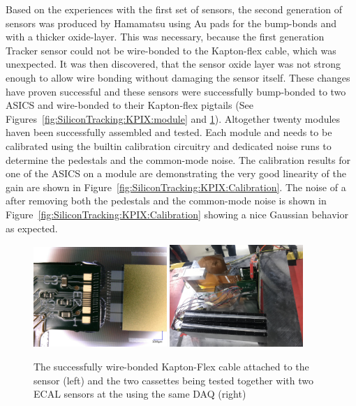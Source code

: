 Based on the experiences with the first set of sensors, the second generation of sensors was produced by Hamamatsu 
using Au pads for the \KPIX bump-bonds and with a thicker oxide-layer. This was necessary, because the first generation Tracker sensor could not be 
wire-bonded to the Kapton-flex cable, which was unexpected. It was then discovered, that the sensor oxide layer was not strong enough 
to allow wire bonding without damaging the sensor itself.
These changes have proven successful and these sensors were successfully bump-bonded to two \KPIX ASICS and wire-bonded to their Kapton-flex pigtails 
(See Figures~\ref{fig:SiliconTracking:KPIX:module} and \ref{fig:SiliconTracking:KPIX:Assembly}). Altogether twenty modules haven been successfully assembled and tested. 
Each module and \KPIX needs to be calibrated using the builtin calibration circuitry and dedicated noise runs to determine the pedestals and the 
common-mode noise.  The calibration results for one of the \KPIX ASICS on a module are demonstrating the very good  linearity of the 
\KPIX gain are shown in  Figure~\ref{fig:SiliconTracking:KPIX:Calibration}. The noise of a \KPIX after removing both the pedestals and the common-mode noise 
is shown in Figure~\ref{fig:SiliconTracking:KPIX:Calibration} showing a nice Gaussian behavior as expected.
\begin{figure}[htbp]
\includegraphics[width=0.45\textwidth]{Tracker/KPIX/KPIX_wirebonding.jpg}
\includegraphics[width=0.45\textwidth]{Tracker/KPIX/TB201902_tracker_Ecal_2.jpg}
\caption{The successfully wire-bonded Kapton-Flex cable attached to the sensor (left) and the two \LYCORIS cassettes being tested together with two \SID ECAL sensors at the \DIITBF using the same DAQ (right)}
\label{fig:SiliconTracking:KPIX:Assembly}
\end{figure}

